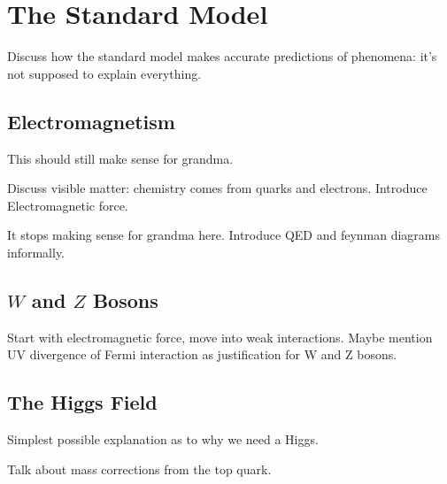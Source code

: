 \section{The Standard Model}
Discuss how the standard model makes accurate predictions of phenomena: it's not supposed to explain everything.
\subsection{Electromagnetism}

This should still make sense for grandma.

Discuss visible matter: chemistry comes from quarks and electrons. Introduce Electromagnetic force.

It stops making sense for grandma here. Introduce QED and feynman diagrams informally.

\subsection{$W$ and $Z$ Bosons}
Start with electromagnetic force, move into weak interactions. Maybe mention UV divergence of Fermi interaction as justification for W and Z bosons.
\subsection{The Higgs Field}
Simplest possible explanation as to why we need a Higgs.

Talk about mass corrections from the top quark.
